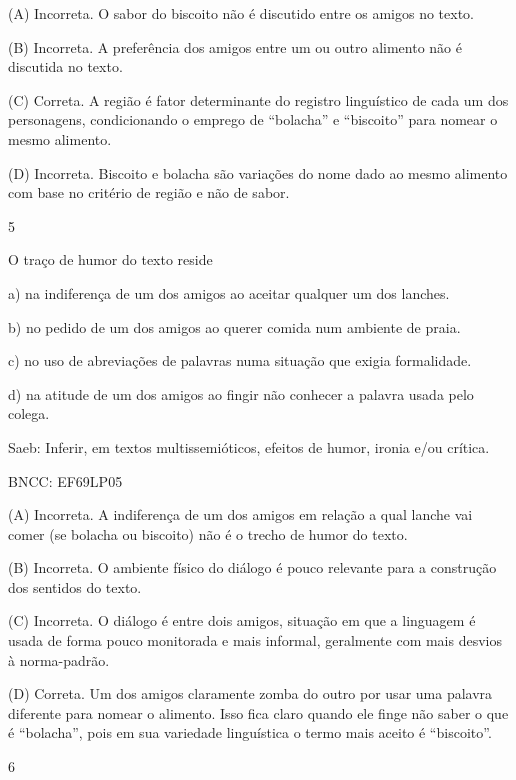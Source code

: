 (A) Incorreta. O sabor do biscoito não é discutido entre os amigos no
texto.

(B) Incorreta. A preferência dos amigos entre um ou outro alimento não é
discutida no texto.

(C) Correta. A região é fator determinante do registro linguístico de
cada um dos personagens, condicionando o emprego de ``bolacha'' e
``biscoito'' para nomear o mesmo alimento.

(D) Incorreta. Biscoito e bolacha são variações do nome dado ao mesmo
alimento com base no critério de região e não de sabor.

\num{5}

O traço de humor do texto reside

a) na indiferença de um dos amigos ao aceitar qualquer um dos lanches.

b) no pedido de um dos amigos ao querer comida num ambiente de praia.

c) no uso de abreviações de palavras numa situação que exigia
formalidade.

d) na atitude de um dos amigos ao fingir não conhecer a palavra usada
pelo colega.

Saeb: Inferir, em textos multissemióticos, efeitos de humor, ironia e/ou
crítica.

BNCC: EF69LP05

(A) Incorreta. A indiferença de um dos amigos em relação a qual lanche
vai comer (se bolacha ou biscoito) não é o trecho de humor do texto.

(B) Incorreta. O ambiente físico do diálogo é pouco relevante para a
construção dos sentidos do texto.

(C) Incorreta. O diálogo é entre dois amigos, situação em que a
linguagem é usada de forma pouco monitorada e mais informal, geralmente
com mais desvios à norma-padrão.

(D) Correta. Um dos amigos claramente zomba do outro por usar uma
palavra diferente para nomear o alimento. Isso fica claro quando ele
finge não saber o que é ``bolacha'', pois em sua variedade linguística o
termo mais aceito é ``biscoito''.

\num{6}

